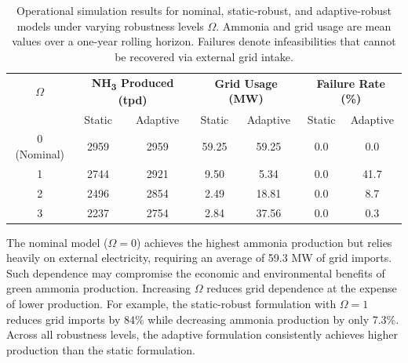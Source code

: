\documentclass[11pt, letter]{article}
\begin{document}
\begin{table}[tbp]
\centering
\caption{Operational simulation results for nominal, static-robust, and adaptive-robust models under varying robustness levels $\Omega$. Ammonia and grid usage are mean values over a one-year rolling horizon. Failures denote infeasibilities that cannot be recovered via external grid intake.}
\label{tab:simulation-operational}
\begin{tabular}{c c c c c c c}
\toprule
$\Omega$ & \multicolumn{2}{c}{\textbf{NH\textsubscript{3} Produced (tpd)}} & \multicolumn{2}{c}{\textbf{Grid Usage (MW)}} & \multicolumn{2}{c}{\textbf{Failure Rate (\%)}} \\
& Static & Adaptive & Static & Adaptive & Static & Adaptive \\
\midrule
0 (Nominal) & 2959 & 2959 & 59.25 & 59.25 & 0.0 & 0.0 \\
1           & 2744 & 2921 &  9.50 &  5.34 & 0.0 & 41.7 \\
2           & 2496 & 2854 &  2.49 & 18.81 & 0.0 &  8.7 \\
3           & 2237 & 2754 &  2.84 & 37.56 & 0.0 &  0.3 \\
\bottomrule
\end{tabular}
\end{table}

The nominal model ($\Omega=0$) achieves the highest ammonia production but relies heavily on external electricity, requiring an average of 59.3 MW of grid imports. Such dependence may compromise the economic and environmental benefits of green ammonia production. Increasing $\Omega$ reduces grid dependence at the expense of lower production. For example, the static-robust formulation with $\Omega=1$ reduces grid imports by 84\% while decreasing ammonia production by only 7.3\%. Across all robustness levels, the adaptive formulation consistently achieves higher production than the static formulation.
\end{document}
